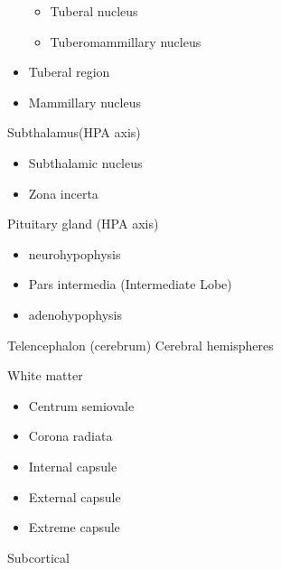 \begin{itemize}
  \begin{itemize}
  \tightlist
  \item
    Tuberal nucleus
  \item
    Tuberomammillary nucleus
  \end{itemize}
\item
  Tuberal region
\item
  Mammillary nucleus
\end{itemize}

Subthalamus(HPA axis)

\begin{itemize}
\tightlist
\item
  Subthalamic nucleus
\item
  Zona incerta
\end{itemize}

Pituitary gland (HPA axis)

\begin{itemize}
\tightlist
\item
  neurohypophysis
\item
  Pars intermedia (Intermediate Lobe)
\item
  adenohypophysis
\end{itemize}

Telencephalon (cerebrum) Cerebral hemispheres

White matter

\begin{itemize}
\tightlist
\item
  Centrum semiovale
\item
  Corona radiata
\item
  Internal capsule
\item
  External capsule
\item
  Extreme capsule
\end{itemize}

Subcortical

